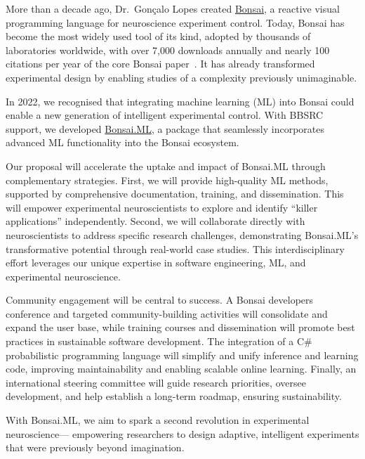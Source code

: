 More than a decade ago, Dr.~Gonçalo Lopes created \href{https://bonsai-rx.org/}{Bonsai}, a reactive visual programming language for neuroscience experiment control. Today, Bonsai has become the most widely used tool of its kind, adopted by thousands of laboratories worldwide, with over 7,000 downloads annually and nearly 100 citations per year of the core Bonsai paper~\citep{lopesEtAl15}. It has already transformed experimental design by enabling studies of a complexity previously unimaginable.

In 2022, we recognised that integrating machine learning (ML) into Bonsai could enable a new generation of intelligent experimental control. With BBSRC support, we developed \href{https://bonsai-rx.org/machinelearning}{Bonsai.ML}, a package that seamlessly incorporates advanced ML functionality into the Bonsai ecosystem.

Our proposal will accelerate the uptake and impact of Bonsai.ML through complementary strategies. First, we will provide high-quality ML methods, supported by comprehensive documentation, training, and dissemination. This will empower experimental neuroscientists to explore and identify “killer applications” independently. Second, we will collaborate directly with neuroscientists to address specific research challenges, demonstrating Bonsai.ML’s transformative potential through real-world case studies. This interdisciplinary effort leverages our unique expertise in software engineering, ML, and experimental neuroscience.

Community engagement will be central to success. A Bonsai developers conference and targeted community-building activities will consolidate and expand the user base, while training courses and dissemination will promote best practices in sustainable software development. The integration of a C\# probabilistic programming language will simplify and unify inference and learning code, improving maintainability and enabling scalable online learning. Finally, an international steering committee will guide research priorities, oversee development, and help establish a long-term roadmap, ensuring sustainability.

With Bonsai.ML, we aim to spark a second revolution in experimental neuroscience— empowering researchers to design adaptive, intelligent experiments that were previously beyond imagination.

